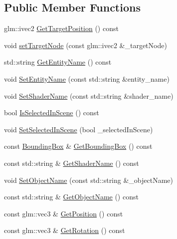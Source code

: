 \subsection*{Public Member Functions}
\begin{DoxyCompactItemize}
\item 
glm\+::ivec2 \mbox{\hyperlink{classpiolot_1_1_entity_afa9c74b8c025139367a3f3fbfe431692}{Get\+Target\+Position}} () const
\item 
void \mbox{\hyperlink{classpiolot_1_1_entity_a8effc8fb437b50228b6467556236a043}{set\+Target\+Node}} (const glm\+::ivec2 \&\+\_\+target\+Node)
\item 
std\+::string \mbox{\hyperlink{classpiolot_1_1_entity_afcf183909460f962951d9775126e35dc}{Get\+Entity\+Name}} () const
\item 
void \mbox{\hyperlink{classpiolot_1_1_entity_a4b458394b15a68f6ecf19e79b60f8730}{Set\+Entity\+Name}} (const std\+::string \&entity\+\_\+name)
\item 
void \mbox{\hyperlink{classpiolot_1_1_entity_a1c52edf232af06086a4058c46d2cb783}{Set\+Shader\+Name}} (const std\+::string \&shader\+\_\+name)
\item 
bool \mbox{\hyperlink{classpiolot_1_1_entity_ae2f2a9ae6613e02d69129e5346884f4e}{Is\+Selected\+In\+Scene}} () const
\item 
void \mbox{\hyperlink{classpiolot_1_1_entity_ab989dc8df66c461663c431993b5b2334}{Set\+Selected\+In\+Scene}} (bool \+\_\+selected\+In\+Scene)
\item 
const \mbox{\hyperlink{classpiolot_1_1_bounding_box}{Bounding\+Box}} \& \mbox{\hyperlink{classpiolot_1_1_entity_a71f340517f503b0187e96e3f0097fdbc}{Get\+Bounding\+Box}} () const
\item 
const std\+::string \& \mbox{\hyperlink{classpiolot_1_1_entity_a95f3ad12bcec709938fb35633d51a3f5}{Get\+Shader\+Name}} () const
\item 
void \mbox{\hyperlink{classpiolot_1_1_entity_a575051c2dffebde6948c421bb9153c3c}{Set\+Object\+Name}} (const std\+::string \&\+\_\+object\+Name)
\item 
const std\+::string \& \mbox{\hyperlink{classpiolot_1_1_entity_a2eeb2cd5d0daf98c49b0e2d2d6227e6d}{Get\+Object\+Name}} () const
\item 
const glm\+::vec3 \& \mbox{\hyperlink{classpiolot_1_1_entity_a9c38cdd359bfab2de36e2478d368a27e}{Get\+Position}} () const
\item 
const glm\+::vec3 \& \mbox{\hyperlink{classpiolot_1_1_entity_a4cd721f2ff085908999d9c100bbaf214}{Get\+Rotation}} () const

\end{DoxyCompactItemize}
